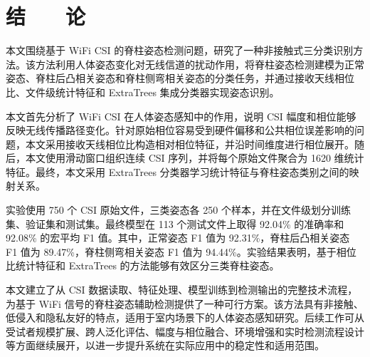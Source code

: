 ﻿%

\chapter*{\hfill 结　　论 \hfill}
\label{conclusion}

本文围绕基于 WiFi CSI 的脊柱姿态检测问题，研究了一种非接触式三分类识别方法。该方法利用人体姿态变化对无线信道的扰动作用，将脊柱姿态检测建模为正常姿态、脊柱后凸相关姿态和脊柱侧弯相关姿态的分类任务，并通过接收天线相位比、文件级统计特征和 ExtraTrees 集成分类器实现姿态识别。

本文首先分析了 WiFi CSI 在人体姿态感知中的作用，说明 CSI 幅度和相位能够反映无线传播路径变化。针对原始相位容易受到硬件偏移和公共相位误差影响的问题，本文采用接收天线相位比构造相对相位特征，并沿时间维度进行相位展开。随后，本文使用滑动窗口组织连续 CSI 序列，并将每个原始文件聚合为 1620 维统计特征。最终，本文采用 ExtraTrees 分类器学习统计特征与脊柱姿态类别之间的映射关系。

实验使用 750 个 CSI 原始文件，三类姿态各 250 个样本，并在文件级划分训练集、验证集和测试集。最终模型在 113 个测试文件上取得 92.04\% 的准确率和 92.08\% 的宏平均 F1 值。其中，正常姿态 F1 值为 92.31\%，脊柱后凸相关姿态 F1 值为 89.47\%，脊柱侧弯相关姿态 F1 值为 94.44\%。实验结果表明，基于相位比统计特征和 ExtraTrees 的方法能够有效区分三类脊柱姿态。

本文建立了从 CSI 数据读取、特征处理、模型训练到检测输出的完整技术流程，为基于 WiFi 信号的脊柱姿态辅助检测提供了一种可行方案。该方法具有非接触、低侵入和隐私友好的特点，适用于室内场景下的人体姿态感知研究。后续工作可从受试者规模扩展、跨人泛化评估、幅度与相位融合、环境增强和实时检测流程设计等方面继续展开，以进一步提升系统在实际应用中的稳定性和适用范围。
